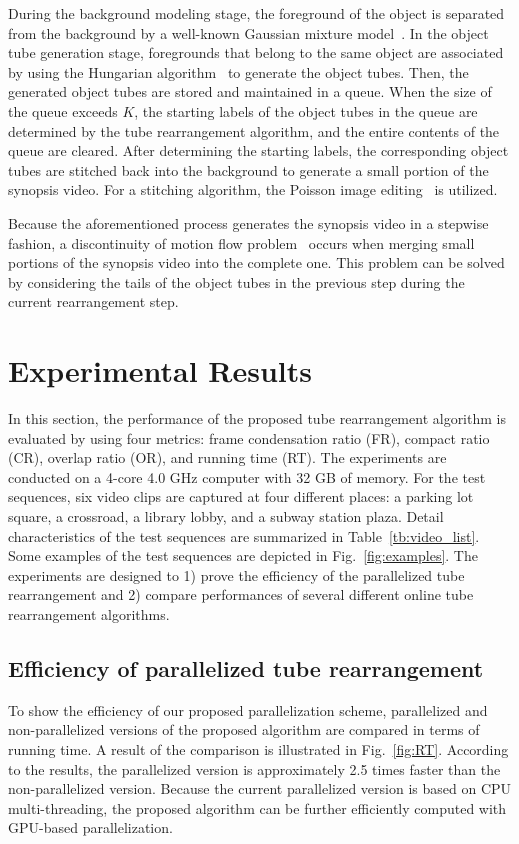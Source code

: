 \documentclass[11pt]{hyu_thesis}
\begin{document}
During the background modeling stage, the foreground of the object is separated from the background by a well-known Gaussian mixture model~\cite{Zivkovic2004}. In the object tube generation stage, foregrounds that belong to the same object are associated by using the Hungarian algorithm~\cite{Kuhn1955} to generate the object tubes. Then, the generated object tubes are stored and maintained in a queue. When the size of the queue exceeds $K$, the starting labels of the object tubes in the queue are determined by the tube rearrangement algorithm, and the entire contents of the queue are cleared. After determining the starting labels, the corresponding object tubes are stitched back into the background to generate a small portion of the synopsis video. For a stitching algorithm, the Poisson image editing~\cite{Perez2003} is utilized. 

Because the aforementioned process generates the synopsis video in a stepwise fashion, a discontinuity of motion flow problem~\cite{Fu2014} occurs when merging small portions of the synopsis video into the complete one. This problem can be solved by considering the tails of the object tubes in the previous step during the current rearrangement step.

\section{Experimental Results}
\label{sec:exp}
In this section, the performance of the proposed tube rearrangement algorithm is evaluated by using four metrics: frame condensation ratio (FR), compact ratio (CR), overlap ratio (OR), and running time (RT). The experiments are conducted on a 4-core 4.0 GHz computer with 32 GB of memory. For the test sequences, six video clips are captured at four different places: a parking lot square, a crossroad, a library lobby, and a subway station plaza. Detail characteristics of the test sequences are summarized in Table~\ref{tb:video_list}. Some examples of the test sequences are depicted in Fig.~\ref{fig:examples}. The experiments are designed to 1) prove the efficiency of the parallelized tube rearrangement and 2) compare performances of several different online tube rearrangement algorithms.

\subsection{Efficiency of parallelized tube rearrangement}

To show the efficiency of our proposed parallelization scheme, parallelized and non-parallelized versions of the proposed algorithm are compared in terms of running time. A result of the comparison is illustrated in Fig.~\ref{fig:RT}. According to the results, the parallelized version is approximately 2.5 times faster than the non-parallelized version. Because the current parallelized version is based on CPU multi-threading, the proposed algorithm can be further efficiently computed with GPU-based parallelization.
\end{document}
